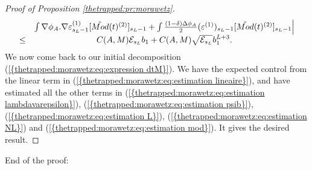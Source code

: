 \documentclass[11pt,a4paper,reqno]{amsart}
\theoremstyle{remark}
\numberwithin{equation}{section}
\begin{document}
\begin{proof}[Proof of Proposition \ref{thetrapped:pr:morawetz}]
\begin{equation}
\begin{array}{r c l}
&\int \nabla \phi_A .\nabla \varepsilon^{(1)}_{s_L-1}[\tilde{Mod}(t)^{(2)}]_{s_L-1} +\int \frac{(1-\delta)\Delta \phi_A}{2}(\varepsilon^{(1)})_{s_L-1} [\tilde{Mod}(t)^{(2)}]_{s_L-1} \Bigr| \\
\leq& C(A,M)\mathcal{E}_{s_L} b_1+C(A,M)\sqrt{\mathcal{E}_{s_L}}b_1^{L+3}.
\end{array}
\end{equation}
We now come back to our initial decomposition {{\rm (\ref{{thetrapped:morawetz:eq:expression dtM}})}}. We have the expected control from the linear term in {{\rm (\ref{{thetrapped:morawetz:eq:estimation lineaire}})}}, and have estimated all the other terms in {{\rm (\ref{{thetrapped:morawetz:eq:estimation lambdavarepsilon}})}}, {{\rm (\ref{{thetrapped:morawetz:eq:estimation psib}})}}, {{\rm (\ref{{thetrapped:morawetz:eq:estimation L}})}}, {{\rm (\ref{{thetrapped:morawetz:eq:estimation NL}})}} and {{\rm (\ref{{thetrapped:morawetz:eq:estimation mod}})}}. It gives the desired result.
\end{proof}

{  \z@{1.5\linespacing\@plus\linespacing}{.5\linespacing}  {\normalfont\bfseries\large\centering}}{End of the proof:}
\label{end:sec:end of the proof}
\end{document}
